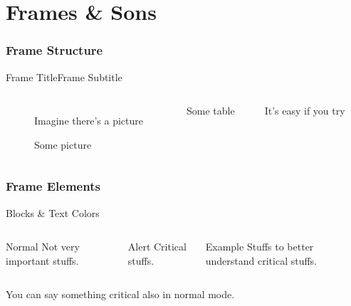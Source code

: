 

\part{Frames \& Sons}

\begin{frame}
\partpage
\end{frame}

\begin{frame}{\contentsname}
\tableofcontents
\end{frame}

\section{Frame Structure}

\begin{frame}{Frame Title}{Frame Subtitle}
\begin{columns}
\begin{figure}
Imagine there's a picture

\caption{Some picture}
\label{fig:some-picture}
\end{figure}

\begin{table}
\caption{Some table}
\label{tab:some-table}

It's easy if you try
\end{table}
\end{columns}
\end{frame}

\section{Frame Elements}

\begin{frame}{Blocks \& Text Colors}
\begin{columns}[t]
\begin{block}{Normal}
Not very important stuffs.
\end{block}

\begin{alertblock}{Alert}
Critical stuffs.
\end{alertblock}

\begin{exampleblock}{Example}
Stuffs to better understand critical stuffs.
\end{exampleblock}
\end{columns}

\bigskip
You can say something \alert{critical} also in normal mode.
\end{frame}

